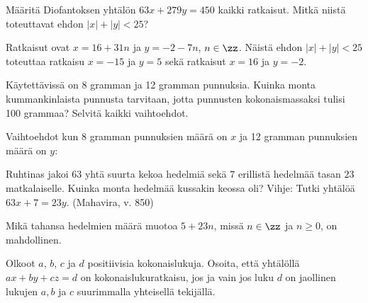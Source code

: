\begin{tehtavasivu}
\begin{tehtava}
\end{tehtava}

\begin{tehtava}
    Määritä Diofantoksen yhtälön $63x + 279y = 450$ kaikki ratkaisut. Mitkä niistä toteuttavat ehdon $|x| + |y| < 25$?
    
    \begin{vastaus}
        Ratkaisut ovat $x = 16 + 31n$ ja $y = -2 - 7n$, $n\in\zz$. Näistä ehdon $|x| + |y| < 25$ toteuttaa ratkaisu $x = -15$ ja $y = 5$ sekä ratkaisut $x = 16$ ja $y = -2$.
    \end{vastaus}
    
\end{tehtava}

\begin{tehtava}
    Käytettävissä on 8 gramman ja 12 gramman punnuksia. Kuinka monta kummankinlaista punnusta tarvitaan, jotta punnusten kokonaismassaksi tulisi 100 grammaa? Selvitä kaikki vaihtoehdot.
    
    \begin{vastaus}
        Vaihtoehdot kun 8 gramman punnuksien määrä on $x$ ja 12 gramman punnuksien määrä on $y$:
    \end{vastaus}
    
\end{tehtava}

\begin{tehtava}
    Ruhtinas jakoi $63$ yhtä suurta kekoa hedelmiä sekä $7$ erillistä hedelmää tasan $23$ matkalaiselle. Kuinka monta hedelmää kussakin keossa oli? Vihje: Tutki yhtälöä $63x + 7 = 23y$. (Mahavira, v. 850)
    
    \begin{vastaus}
        Mikä tahansa hedelmien määrä muotoa $5 + 23n$, missä $n\in\zz$ ja $n\geq 0$, on mahdollinen.
    \end{vastaus}
    
\end{tehtava}

\begin{tehtava}
    Olkoot $a$, $b$, $c$ ja $d$ positiivisia kokonaislukuja. Osoita, että yhtälöllä $ax+by+cz=d$ on kokonaislukuratkaisu, jos ja vain jos luku $d$ on jaollinen lukujen $a, b$ ja $c$ suurimmalla yhteisellä tekijällä.
\end{tehtava}

\end{tehtavasivu}

